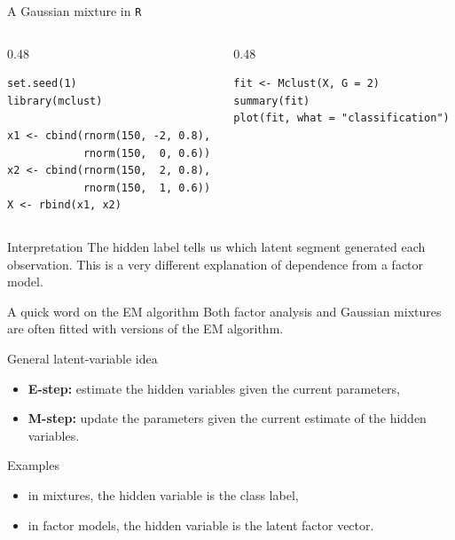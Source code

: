 \documentclass[dvipsnames,aspectratio=169,handout]{beamer}
\begin{document}
\begin{frame}[fragile]{A Gaussian mixture in \texttt{R}}
\begin{columns}[T,onlytextwidth]
\begin{column}{0.48\textwidth}
\begin{lstlisting}
set.seed(1)
library(mclust)

x1 <- cbind(rnorm(150, -2, 0.8),
            rnorm(150,  0, 0.6))
x2 <- cbind(rnorm(150,  2, 0.8),
            rnorm(150,  1, 0.6))
X <- rbind(x1, x2)
\end{lstlisting}
\end{column}
\begin{column}{0.48\textwidth}
\begin{lstlisting}
fit <- Mclust(X, G = 2)
summary(fit)
plot(fit, what = "classification")
\end{lstlisting}
\end{column}
\end{columns}

\begin{alertblock}{Interpretation}
The hidden label tells us which latent segment generated each observation.
This is a very different explanation of dependence from a factor model.
\end{alertblock}
\end{frame}

\begin{frame}{A quick word on the EM algorithm}
Both factor analysis and Gaussian mixtures are often fitted with versions of the EM algorithm.

\begin{block}{General latent-variable idea}
\begin{itemize}
    \item \textbf{E-step:} estimate the hidden variables given the current parameters,
    \item \textbf{M-step:} update the parameters given the current estimate of the hidden variables.
\end{itemize}
\end{block}

\begin{alertblock}{Examples}
\begin{itemize}
    \item in mixtures, the hidden variable is the class label,
    \item in factor models, the hidden variable is the latent factor vector.
\end{itemize}
\end{alertblock}
\end{frame}
\end{document}
